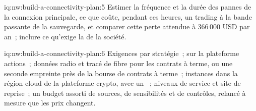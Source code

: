 \begin{solution}{iq:nw:build-a-connectivity-plan:5}
Estimer la fréquence et la durée des pannes de la connexion principale, ce que coûte, pendant ces heures, un trading à la bande passante de la sauvegarde, et comparer cette
perte attendue à 366\,000 USD par an~; inclure ce qu'exige la  de la société.
\end{solution}

\begin{solution}{iq:nw:build-a-connectivity-plan:6}
Exigences par stratégie~;  sur la plateforme actions~; données radio et tracé de fibre pour les contrats à terme, ou une seconde empreinte près de la
bourse de contrats à terme~; instances dans la région cloud de la plateforme crypto, avec un ~; niveaux de service et site de reprise~; un budget assorti de sources,
de sensibilités et de contrôles, relancé à mesure que les prix changent.
\end{solution}
